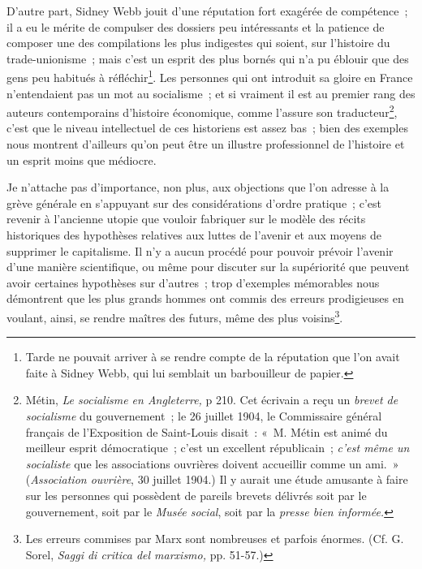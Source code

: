 \documentclass[french,twoside]{book} %
\begin{document}
D’autre part, Sidney Webb jouit d’une réputation fort exagérée de compétence ; il a eu le mérite de compulser des dossiers peu intéressants et la patience de composer une des compilations les plus indigestes qui soient, sur l’histoire du trade-unionisme ; mais c’est un esprit des plus bornés qui n’a pu éblouir que des gens peu habitués à réfléchir\footnote{ \noindent Tarde ne pouvait arriver à se rendre compte de la réputation que l’on avait faite à Sidney Webb, qui lui semblait un barbouilleur de papier.
 }. Les personnes qui ont introduit sa gloire en France n’entendaient pas un mot au socialisme ; et si vraiment il est au premier rang des auteurs contemporains d’histoire économique, comme l’assure son traducteur\footnote{ \noindent Métin, \emph{Le socialisme en Angleterre,} p 210. Cet écrivain a reçu un \emph{brevet de socialisme} du gouvernement ; le 26 juillet 1904, le Commissaire général français de l’Exposition de Saint-Louis disait : « M. Métin est animé du meilleur esprit démocratique ; c’est un excellent républicain ; \emph{c’est même un socialiste} que les associations ouvrières doivent accueillir comme un ami. » (\emph{Association ouvrière}, 30 juillet 1904.) Il y aurait une étude amusante à faire sur les personnes qui possèdent de pareils brevets délivrés soit par le gouvernement, soit par le \emph{Musée social}, soit par la \emph{presse bien informée.}
 }, c’est que le niveau intellectuel de ces historiens est assez bas ; bien des exemples nous montrent d’ailleurs qu’on peut être un illustre professionnel de l’histoire et un esprit moins que médiocre.\par
 Je n’attache pas d’importance, non plus, aux objections que l’on adresse à la grève générale en s’appuyant sur des considérations d’ordre pratique ; c’est revenir à l’ancienne utopie que vouloir fabriquer sur le modèle des récits historiques des hypothèses relatives aux luttes de l’avenir et aux moyens de supprimer le capitalisme. Il n’y a aucun procédé pour pouvoir prévoir l’avenir d’une manière scientifique, ou même pour discuter sur la supériorité que peuvent avoir certaines hypothèses sur d’autres ; trop d’exemples mémorables nous démontrent que les plus grands hommes ont commis des erreurs prodigieuses en voulant, ainsi, se rendre maîtres des futurs, même des plus voisins\footnote{ \noindent Les erreurs commises par Marx sont nombreuses et parfois énormes. (Cf. G. Sorel, \emph{Saggi di critica del marxismo,} pp. 51-57.)
 }.\par
\end{document}
